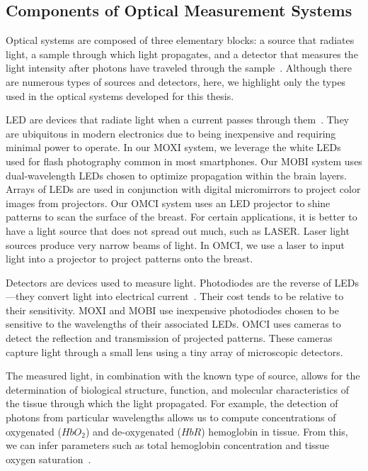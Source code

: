 \subsection{Components of Optical Measurement Systems}
Optical systems are composed of three elementary blocks: a source that radiates light, a sample through which light propagates, and a detector that measures the light intensity after photons have traveled through the sample~\cite{Webster2010}. Although there are numerous types of sources and detectors, here, we highlight only the types used in the optical systems developed for this thesis. 

\ac{LED} are devices that radiate light when a current passes through them~\cite{Webster2010}. They are ubiquitous in modern electronics due to being inexpensive and requiring minimal power to operate. In our \ac{MOXI} system, we leverage the white LEDs used for flash photography common in most smartphones. Our \ac{MOBI} system uses dual-wavelength \ac{LED}s chosen to optimize propagation within the brain layers. Arrays of \ac{LED}s are used in conjunction with digital micromirrors to project color images from projectors. Our \ac{OMCI} system uses an \ac{LED} projector to shine patterns to scan the surface of the breast. For certain applications, it is better to have a light source that does not spread out much, such as \ac{LASER}. Laser light sources produce very narrow beams of light. In \ac{OMCI}, we use a laser to input light into a projector to project patterns onto the breast. 

Detectors are devices used to measure light. Photodiodes are the reverse of \ac{LED}s---they convert light into electrical current~\cite{Webster2010}. Their cost tends to be relative to their sensitivity. \ac{MOXI} and \ac{MOBI} use inexpensive photodiodes chosen to be sensitive to the wavelengths of their associated \ac{LED}s. \ac{OMCI} uses cameras to detect the reflection and transmission of projected patterns. These cameras capture light through a small lens using a tiny array of microscopic detectors. 

The measured light, in combination with the known type of source, allows for the determination of biological structure, function, and molecular characteristics of the tissue through which the light propagated. For example, the detection of photons from particular wavelengths allows us to compute concentrations of oxygenated ($HbO_2$) and de-oxygenated ($HbR$) hemoglobin in tissue. From this, we can infer parameters such as total hemoglobin concentration and tissue oxygen saturation~\cite{Nunez2018}. 


